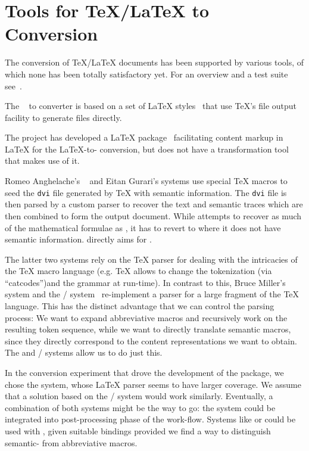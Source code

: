 \section{Tools for {\TeX}/{\LaTeX} to {\xml} Conversion}

The conversion of {\TeX/\LaTeX} documents has been supported by various tools, of
which none has been totally satisfactory yet. For an overview and a test suite
see~\cite{MathmlTeXSuite}.

The {}~\cite{DweLinLuth:tucm04} to {\omdoc} converter is based on a
set of {\LaTeX} styles~\cite[Chapter 4]{Kohlhase:omfmd01} that use {\TeX}'s file
output facility to generate {\omdoc} files directly.
 
The {\connexions} project has developed a {\LaTeX}
package~\cite{WillHenBar:clsfflc03} facilitating content markup in {\LaTeX} for
the {\LaTeX}-to-{\cnxml} conversion, but does not have a transformation tool that
makes use of it.

Romeo Anghelache's {\hermes}~\cite{Anghelache:hermes} and Eitan Gurari's {\texfourht}
systems use special {\TeX} macros to seed the {\tt{dvi}} file generated by {\TeX}
with semantic information.  The {\tt{dvi}} file is then parsed by a custom parser
to recover the text and semantic traces which are then combined to form the output
{\xml} document. While {\hermes} attempts to recover as much of the mathematical
formulae as {\cmathml}, it has to revert to {\pmathml} where it does not have
semantic information. {\texfourht} directly aims for {\pmathml}.

The latter two systems rely on the {\TeX} parser for dealing with the intricacies
of the {\TeX} macro language (e.g. {\TeX} allows to change the tokenization (via
``catcodes'')and the grammar at run-time). In contrast to this, Bruce Miller's
{\latexml}~\cite{Miller:latexml} system and the {/}
system~\cite{VanDenBrandStuber2003} re-implement a parser for a large fragment of
the {\TeX} language. This has the distinct advantage that we can control the
parsing process: We want to expand abbreviative macros and recursively work on the
resulting token sequence, while we want to directly translate semantic macros,
since they directly correspond to the content representations we want to obtain.
The {\latexml} and {/} systems allow us to do just this.

In the conversion experiment that drove the development of the {\stex} package, we
chose the {\latexml} system, whose {\LaTeX} parser seems to have larger coverage.
We assume that a solution based on the {/} system would
work similarly.  Eventually, a combination of both systems might be the way to go:
the {} system could be integrated into post-processing phase of the
{\latexml} work-flow.  Systems like {\hermes} or {\texfourht} could be used with
{\stex}, given suitable {\stex} bindings provided we find a way to distinguish
semantic- from abbreviative macros.

